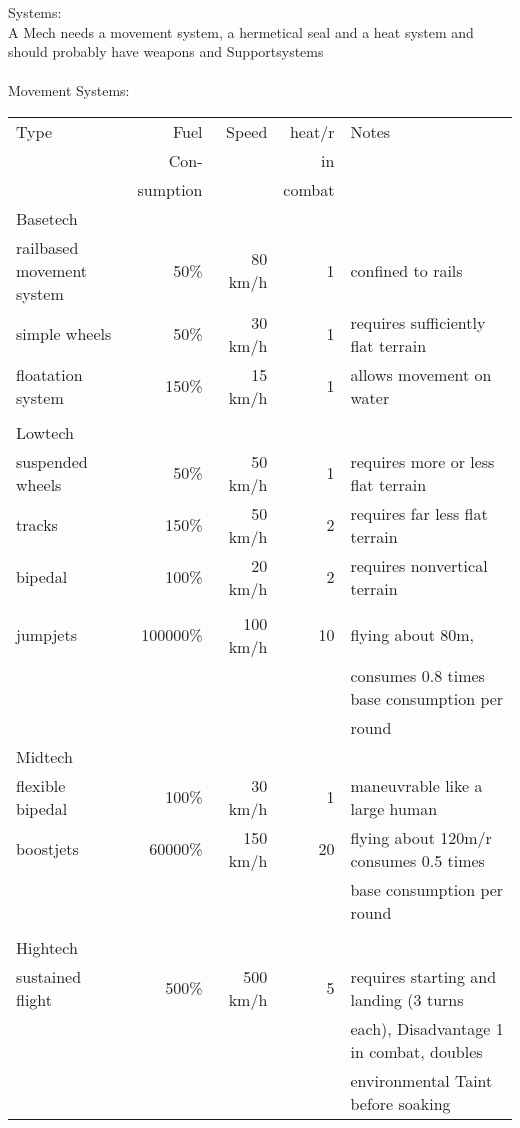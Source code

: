 \documentclass{article}
\begin{document}
Systems:\\
A Mech needs a movement system, a hermetical seal and a heat system and should probably have weapons and Supportsystems\\\\
Movement Systems:\\
\begin{tabular}{l|rrrl}
Type & Fuel & Speed & heat/r  & Notes\\&Con-&&in\\& sumption&&combat\\
Basetech\\ \hline
railbased movement system & 50\% & 80 km/h &1 &  confined to rails\\
simple wheels & 50\% & 30 km/h & 1& requires sufficiently flat terrain \\
floatation system & 150\% & 15 km/h & 1& allows movement on water\\ \\
Lowtech\\\hline
suspended wheels & 50\% & 50 km/h & 1& requires more or less flat terrain\\
tracks & 150\% & 50 km/h & 2& requires far less flat terrain\\
bipedal & 100\% & 20 km/h & 2& requires nonvertical terrain\\\\
jumpjets & 100000\% & 100 km/h &10& flying about 80m,\\&&&& consumes 0.8 times base consumption per \\&&&& round\\
Midtech\\\hline
flexible bipedal& 100\%& 30 km/h & 1& maneuvrable like a large human\\
boostjets & 60000\% & 150 km/h &20& flying about 120m/r consumes 0.5 times\\&&&&  base consumption per round\\\\
Hightech\\\hline
sustained flight & 500\% & 500 km/h &5& requires starting and landing (3 turns \\&&&& each), Disadvantage 1 in combat, doubles
                                                                                     \\&&&&environmental Taint before soaking\\
\end{tabular}\\\\\\
\end{document}
